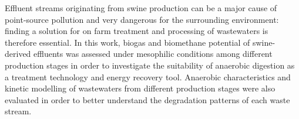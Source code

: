 Effluent streams originating from swine production can be a major cause of point-source pollution and very dangerous for the surrounding environment: finding a solution for on farm treatment and processing of wastewaters is therefore essential. In this work, biogas and biomethane potential of swine-derived effluents was assessed under mesophilic conditions among different production stages in order to investigate the suitability of anaerobic digestion as a treatment technology and energy recovery tool. Anaerobic characteristics and kinetic modelling of wastewaters from different production stages were also evaluated in order to better understand the degradation patterns of each waste stream.